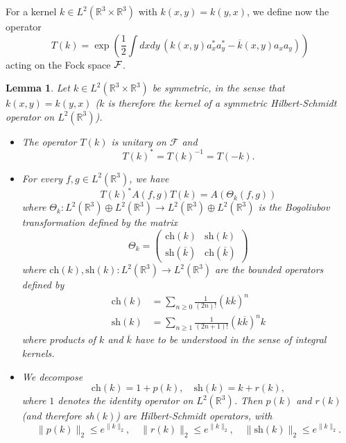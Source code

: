 \documentclass[11pt,a4paper]{article}
\newtheorem{lem}[thm]{Lemma}
\newcommand{\bR}{{\mathbb R}}
\newcommand{\cF}{{\cal F}}
\newcommand{\R}{\mathbb{R}}
\begin{document}
\medskip

For a kernel $k \in L^2 (\bR^3 \times \bR^3)$ with $k (x,y) = k(y,x)$, we define now the operator 
\begin{equation}\label{eq:Tk-def} T (k) = \exp \left(\frac{1}{2} \int dx dy \, \left(k(x,y) a_x^* a_y^* - \overline{k} (x,y) a_x a_y \right) \right) \end{equation} 
acting on the Fock space $\cF$. 
\begin{lem} \label{l:bt}
Let $k \in L^2(\R^3 \times \R^3)$ be symmetric, in the sense that $k(x,y) = k(y,x)$ ($k$ is therefore the kernel of a symmetric Hilbert-Schmidt operator on $L^2 (\bR^3)$). 
\begin{itemize}
\item[(i)] The operator $T(k)$ is unitary on $\mathcal{F}$ and
  \[
    T(k)^* = T(k)^{-1} = T(-k).
  \]
\item[(ii)] For every $f,g \in L^2 (\bR^3)$, we have 
\begin{equation}\label{eq:TAT} T (k)^* A(f,g) T(k) = A (\Theta_k (f,g)) \end{equation}
where $\Theta_k : L^2 (\bR^3) \oplus L^2 (\bR^3) \to L^2 (\bR^3) \oplus L^2 (\bR^3)$ is the Bogoliubov transformation defined by the matrix 
\[ \Theta_k = \left(\begin{array}{ll} \text{ch} (k)  & \text{sh} (k)  \\ \text{sh} (\overline{k}) & \text{ch} (\overline{k}) \end{array} \right) \]
where $\text{ch} (k), \text{sh} (k) : L^2 (\bR^3) \to L^2 (\bR^3)$ are the bounded operators defined by 
\[ \begin{split} 
\text{ch} (k) & = \sum_{n\geq 0} \frac{1}{(2n)!} (k\overline{k})^n \\
\text{sh} (k)  & = \sum_{n \geq 1} \frac{1}{(2n+1)!} (k\overline{k})^n k \end{split} \]
where products of $k$ and $\overline{k}$ have to be understood in the sense of integral kernels. 
\item[(iii)] We decompose 
\begin{equation}\label{eq:pr-def} \text{ch} (k) = 1 + p (k) , \quad \text{sh} (k) = k + r (k), \end{equation}
where $1$ denotes the identity operator on $L^2 (\bR^3)$. Then $p (k)$ and $r (k)$ (and therefore sh$(k)$) are Hilbert-Schmidt operators, with 
\begin{equation}
 \| p (k) \|_{2}  \le e^{\| k \|_{2}}, \quad 
\| r (k) \|_{2} \le e^{\| k \|_{2}},  \quad \| \text{sh} (k) \|_2 \leq  e^{\| k \|_{2}}.

\end{equation}
\end{itemize}
\end{lem}
\end{document}
